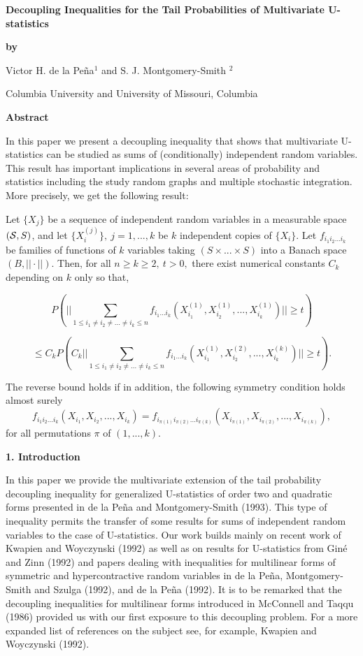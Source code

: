 

\centerline{\bf Decoupling Inequalities for the Tail Probabilities of
Multivariate U-statistics}


\centerline{\bf by}

\centerline{Victor H. de la Pe\~na$^{1}$ and S. J. Montgomery-Smith $^{2}$}

\centerline{Columbia University and University of Missouri, Columbia}
\vskip 0.2in
\centerline{\bf Abstract}
\vskip 0.2in

In this paper we present a decoupling inequality that shows that
multivariate U-statistics can be studied as sums of (conditionally)
independent random variables. This result has important implications
in several areas of probability and statistics including
the study random graphs and multiple stochastic integration. 
More precisely, we get the following result:

  Let $\{X_j\}$  be a sequence of independent
random variables in a measurable space $({\cal S},S)$, and let $\{ X_i^{(j)}\}, ~j=1,...,k$
be $k$ independent copies of $\{X_i\}$. Let $f_{i_1i_2...i_k}$ be families of 
functions of $ k $ variables taking $(S \times ... \times S)$ into a Banach
space $(B,||\cdot||)$. Then, for all $n\ge k \ge 2,~t>0,$ there exist numerical
constants $C_k$ depending on $k$ only so that,

$$P(||\sum_{1\le i_1 \ne i_2 \ne ... \ne i_k \le n} f_{i_1...i_k}
(X_{i_1}^{(1 )},X_{i_2}^{(1)},...,X_{i_k}^{(1)}) || \ge t) 
$$

$$ \le C_k
P( C_k||\sum_{1\le i_1 \ne i_2 \ne ... \ne i_k \le n} f_{i_1...i_k}
(X_{i_1}^{(1 )},X_{i_2}^{(2)},...,X_{i_k}^{(k)}) || \ge t).
$$

The reverse bound holds if in addition, the following symmetry condition 
holds almost surely
$$f_{i_1i_2...i_k}(X_{i_1},X_{i_2},...,X_{i_k}) =
f_{i_{ \pi (1)}i_{\pi (2)}...i_{\pi (k)}}(X_{ i_{\pi (1)}},X_{i_{\pi (2)}},...,
X_{ i_{\pi (k)}}),$$ 
\noindent for all permutations $\pi $ of $(1,...,k)$.

\centerline{\bf 1. Introduction}

In this paper we provide the multivariate extension of the  tail probability
decoupling
inequality for generalized U-statistics of order two and quadratic forms
presented in de la Pe\~na and Montgomery-Smith (1993). This type of 
inequality permits the transfer of some results
for sums of independent random variables to the case of U-statistics.
Our work  builds mainly on recent work of 
Kwapien and Woyczynski (1992) as well as on results for U-statistics from  
Gin\'e  and Zinn (1992) 
and papers dealing with inequalities for multilinear forms
of symmetric and
hypercontractive random variables in 
de la Pe\~na, Montgomery-Smith and Szulga (1992), and de la Pe\~na (1992).
It is to be remarked that the decoupling inequalities for multilinear forms
introduced in McConnell and Taqqu (1986) provided us with our first 
exposure to this decoupling problem. For a more expanded list of
references on the subject
see, for example, Kwapien and Woyczynski (1992).

